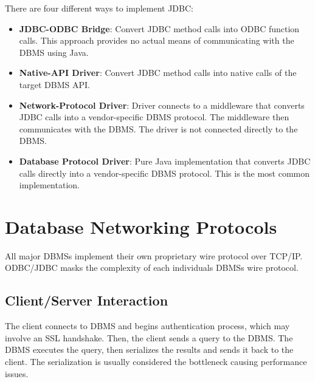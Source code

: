 \documentclass[11pt]{article}
\begin{document}
There are four different ways to implement JDBC:
\begin{itemize}
    \item \textbf{JDBC-ODBC Bridge}:
    Convert JDBC method calls into ODBC function calls. This approach provides no actual means of 
    communicating with the DBMS using Java.
    
    \item \textbf{Native-API Driver}:
    Convert JDBC method calls into native calls of the target 
    DBMS API.
    
    \item \textbf{Network-Protocol Driver}:
    Driver connects to a middleware that converts JDBC calls into a vendor-specific DBMS protocol. 
    The middleware then communicates with the DBMS. The driver is not connected directly to the 
    DBMS.
    
    \item \textbf{Database Protocol Driver}:
    Pure Java implementation that converts JDBC calls directly into a vendor-specific DBMS protocol. 
    This is the most common implementation.
\end{itemize}

\section{Database Networking Protocols}
All major DBMSs implement their own proprietary wire protocol over TCP/IP. ODBC/JDBC masks the 
complexity of each individuals DBMSs wire protocol.

\subsection*{Client/Server Interaction}
The client connects to DBMS and begins authentication process, which may involve an SSL handshake. 
Then, the client sends a query to the DBMS. The DBMS executes the query, then serializes the results 
and sends it back to the client. The serialization is usually considered the bottleneck causing 
performance issues.

\end{document}
